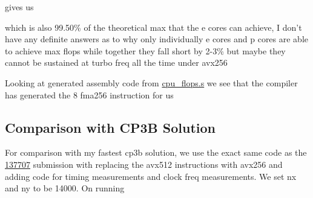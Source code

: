 gives us

\begin{Shaded}
\begin{Highlighting}[]
\end{Highlighting}
\end{Shaded}

which is also 99.50\% of the theoretical max that the e cores can
achieve, I don't have any definite answers as to why only individually e
cores and p cores are able to achieve max flops while together they fall
short by 2-3\% but maybe they cannot be sustained at turbo freq all the
time under avx256

Looking at generated assembly code from
\href{./cpu_flops.s}{cpu\_flops.s} we see that the compiler has
generated the 8 fma256 instruction for us

\begin{Shaded}
\begin{Highlighting}[]
\end{Highlighting}
\end{Shaded}

\hypertarget{comparison-with-cp3b-solution}{%
\subsection{Comparison with CP3B
Solution}\label{comparison-with-cp3b-solution}}

For comparison with my fastest cp3b solution, we use the exact same code
as the
\href{https://ppc-exercises.cs.aalto.fi/course/aalto2025/cp/cp3b/137707}{137707}
submission with replacing the avx512 instructions with avx256 and adding
code for timing measurements and clock freq measurements. We set nx and
ny to be 14000. On running

